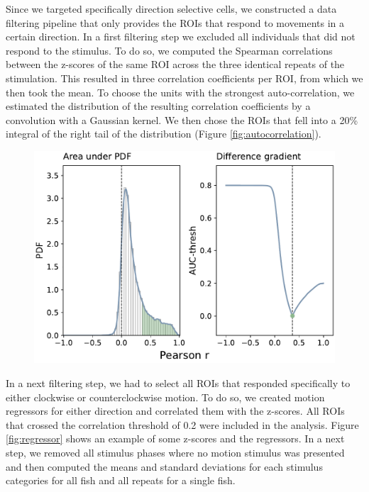Since we targeted specifically direction selective cells, we constructed a data filtering pipeline that only provides the ROIs that respond to movements in a certain direction. In a first filtering step we excluded all individuals that did not respond to the stimulus. To do so, we computed the Spearman correlations between the z-scores of the same ROI across the three identical repeats of the stimulation. This resulted in three correlation coefficients per ROI, from which we then took the mean. To choose the units with the strongest auto-correlation, we estimated the distribution of the resulting correlation coefficients by a convolution with a Gaussian kernel. We then chose the ROIs that fell into a 20\% integral of the right tail of the distribution (Figure \ref{fig:autocorrelation}).

\begin{figure}[H]
    \centering
    \includegraphics[width=0.8\linewidth]{figures/pcorrelation.pdf}
    \label{fig:pcorrelation}
\end{figure}

In a next filtering step, we had to select all ROIs that responded specifically to either clockwise or counterclockwise motion. To do so, we created motion regressors for either direction and correlated them with the z-scores. All ROIs that crossed the correlation threshold of 0.2 were included in the analysis. Figure \ref{fig:regressor} shows an example of some z-scores and the regressors. In a next step, we removed all stimulus phases where no motion stimulus was presented and then computed the means and standard deviations for each stimulus categories for all fish and all repeats for a single fish. 

